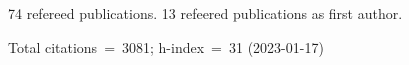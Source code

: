 74 refereed publications. 13 refeered publications as first author.

Total citations~=~3081; h-index~=~31 (2023-01-17)